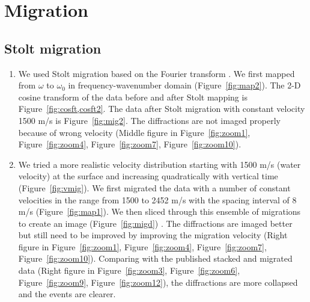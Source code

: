 \section{Migration}

\subsection{Stolt migration}

\begin{enumerate}
 
\item We used Stolt migration based on the Fourier transform \cite[]{GEO50-11-22192244}. We first mapped from $\omega$ to $\omega_0$ in frequency-wavenumber domain (Figure~\ref{fig:map2}). The 2-D cosine transform of the data before and after Stolt mapping is Figure~\ref{fig:cosft,cosft2}. The data after Stolt migration with constant velocity 1500 m/s is Figure~\ref{fig:mig2}. The diffractions are not imaged properly because of wrong velocity (Middle figure in Figure~\ref{fig:zoom1}, Figure~\ref{fig:zoom4}, Figure~\ref{fig:zoom7}, Figure~\ref{fig:zoom10}). 

\item We tried a more realistic velocity distribution starting with 1500 m/s (water velocity) at the surface and increasing quadratically with vertical time (Figure~\ref{fig:vmig}). We first migrated the data with a number of constant velocities in the range from 1500 to 2452 m/s with the spacing interval of 8 m/s (Figure~\ref{fig:map1}). We then sliced through this ensemble of migrations to create an image (Figure~\ref{fig:migd}) \cite[]{GEO57-01-00510059}. The diffractions are imaged better but still need to be improved by improving the migration velocity (Right figure in Figure~\ref{fig:zoom1}, Figure~\ref{fig:zoom4}, Figure~\ref{fig:zoom7}, Figure~\ref{fig:zoom10}). Comparing with the published stacked and migrated data (Right figure in Figure~\ref{fig:zoom3}, Figure~\ref{fig:zoom6}, Figure~\ref{fig:zoom9}, Figure~\ref{fig:zoom12}), the diffractions are more collapsed and the events are clearer.


\end{enumerate}\clearpage

